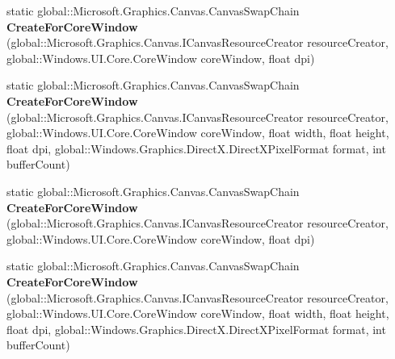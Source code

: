 \begin{DoxyCompactItemize}
\item 
\mbox{\label{class_microsoft_1_1_graphics_1_1_canvas_1_1_canvas_swap_chain_a8fa08daf46ee7d57c889792586e27f7c}} 
static global\+::\+Microsoft.\+Graphics.\+Canvas.\+Canvas\+Swap\+Chain {\bfseries Create\+For\+Core\+Window} (global\+::\+Microsoft.\+Graphics.\+Canvas.\+I\+Canvas\+Resource\+Creator resource\+Creator, global\+::\+Windows.\+U\+I.\+Core.\+Core\+Window core\+Window, float dpi)
\item 
\mbox{\label{class_microsoft_1_1_graphics_1_1_canvas_1_1_canvas_swap_chain_ac26b19a1cacc3024720abd11fbc18999}} 
static global\+::\+Microsoft.\+Graphics.\+Canvas.\+Canvas\+Swap\+Chain {\bfseries Create\+For\+Core\+Window} (global\+::\+Microsoft.\+Graphics.\+Canvas.\+I\+Canvas\+Resource\+Creator resource\+Creator, global\+::\+Windows.\+U\+I.\+Core.\+Core\+Window core\+Window, float width, float height, float dpi, global\+::\+Windows.\+Graphics.\+Direct\+X.\+Direct\+X\+Pixel\+Format format, int buffer\+Count)
\item 
\mbox{\label{class_microsoft_1_1_graphics_1_1_canvas_1_1_canvas_swap_chain_a8fa08daf46ee7d57c889792586e27f7c}} 
static global\+::\+Microsoft.\+Graphics.\+Canvas.\+Canvas\+Swap\+Chain {\bfseries Create\+For\+Core\+Window} (global\+::\+Microsoft.\+Graphics.\+Canvas.\+I\+Canvas\+Resource\+Creator resource\+Creator, global\+::\+Windows.\+U\+I.\+Core.\+Core\+Window core\+Window, float dpi)
\item 
\mbox{\label{class_microsoft_1_1_graphics_1_1_canvas_1_1_canvas_swap_chain_ac26b19a1cacc3024720abd11fbc18999}} 
static global\+::\+Microsoft.\+Graphics.\+Canvas.\+Canvas\+Swap\+Chain {\bfseries Create\+For\+Core\+Window} (global\+::\+Microsoft.\+Graphics.\+Canvas.\+I\+Canvas\+Resource\+Creator resource\+Creator, global\+::\+Windows.\+U\+I.\+Core.\+Core\+Window core\+Window, float width, float height, float dpi, global\+::\+Windows.\+Graphics.\+Direct\+X.\+Direct\+X\+Pixel\+Format format, int buffer\+Count)
\item 
\mbox{\label{class_microsoft_1_1_graphics_1_1_canvas_1_1_canvas_swap_chain_a8fa08daf46ee7d57c889792586e27f7c}} 

\end{DoxyCompactItemize}
